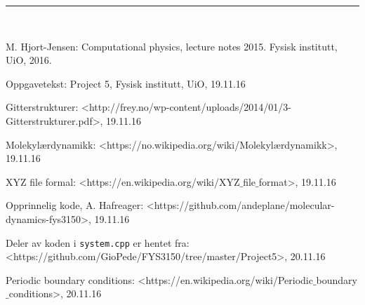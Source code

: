 \documentclass[paper=a4, fontsize=11pt]{scrartcl} %
\numberwithin{equation}{section} %
\numberwithin{figure}{section} %
\numberwithin{table}{section} %
\newcommand{\horrule}[1]{\rule{\linewidth}{#1}} %
\begin{document}
\horrule{2pt} \\[0.5cm] %


\begin{thebibliography}{9}  
    
\bibitem{}
   M. Hjort-Jensen: Computational physics, lecture notes 2015. Fysisk institutt, UiO, 2016.

\bibitem{}
   Oppgavetekst: Project 5, Fysisk institutt, UiO, 19.11.16
   
\bibitem{}
 Gitterstrukturer: <http://frey.no/wp-content/uploads/2014/01/3-Gitterstrukturer.pdf>, 19.11.16  
 
 \bibitem{}
  Molekylærdynamikk: <https://no.wikipedia.org/wiki/Molekyl$æ$rdynamikk>, 19.11.16
  
\bibitem{}
 XYZ file formal: <https://en.wikipedia.org/wiki/XYZ$\_$file$\_$format>, 19.11.16
 
 \bibitem{}
 Opprinnelig kode, A. Hafreager: <https://github.com/andeplane/molecular-dynamics-fys3150>, 19.11.16
  
\bibitem{}
  Deler av koden i \texttt{system.cpp} er hentet fra: <https://github.com/GioPede/FYS3150/tree/master/Project5>,
  20.11.16
  
 \bibitem{}
 Periodic boundary conditions: <https://en.wikipedia.org/wiki/Periodic$\_$boundary$\_$conditions>, 20.11.16

   
\end{thebibliography}
\end{document}
